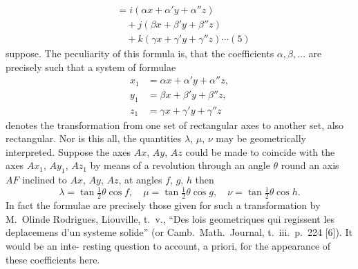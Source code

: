 \documentclass[12pt,a4paper]{article}
\begin{document}
\begin{equation}
\begin{aligned}
&= i(\alpha x + \alpha' y + \alpha'' z) \\
&\quad + j(\beta x + \beta' y + \beta'' z) \\
&\quad + k(\gamma x + \gamma' y + \gamma'' z) \cdots (5)
\end{aligned}
\end{equation}
suppose. The peculiarity of this formula is, that the coefficients $\alpha, \beta, \ldots$ are precisely
such that a system of formulae
\begin{align*}
x_1 &= \alpha x + \alpha' y + \alpha'' z,\\
y_1 &= \beta x + \beta' y + \beta'' z,\\
z_1 &= \gamma x + \gamma' y + \gamma'' z
\end{align*}
denotes the transformation from one set of rectangular axes to another set, also
rectangular. Nor is this all, the quantities $\lambda$, $\mu$, $\nu$ may be geometrically interpreted.
Suppose the axes $Ax$, $Ay$, $Az$ could be made to coincide with the axes $Ax_1$, $Ay_1$, $Az_1$
by means of a revolution through an angle $\theta$ round an axis $AF$ inclined to $Ax$, $Ay$, $Az$,
at angles $f$, $g$, $h$ then
\[
\lambda = \tan\tfrac{1}{2}\theta \cos f,\quad \mu = \tan\tfrac{1}{2}\theta \cos g,\quad \nu = \tan\tfrac{1}{2}\theta \cos h.
\]
In fact the formulae are precisely those given for such a transformation by M.~Olinde
Rodrigues, Liouville, t.~v., ``Des lois geometriques qui regissent les deplacemens d'un
systeme solide'' (or Camb.\ Math.\ Journal, t.~iii.\ p.~224 [6]). It would be an inte-
resting question to account, a priori, for the appearance of these coefficients here.
\end{document}
